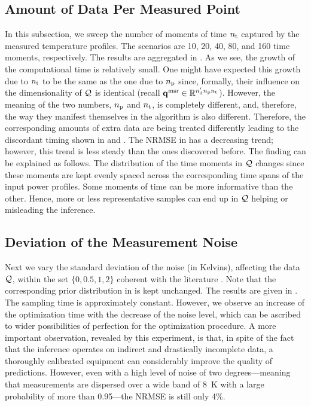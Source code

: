\subsection{Amount of Data Per Measured Point}
In this subsection, we sweep the number of moments of time ${n_\text{t}}$ captured by the measured temperature profiles.
The scenarios are 10, 20, 40, 80, and 160 time moments, respectively.
The results are aggregated in .
As we see, the growth of the computational time is relatively small.
One might have expected this growth due to ${n_\text{t}}$ to be the same as the one due to ${n_\text{p}}$ since, formally, their influence on the dimensionality of $\mathcal{Q}$ is identical (recall $\mathbf{q}^{\text{msr}} \in \mathbb{R}^{{n_\text{d}'} {n_\text{p}} {n_\text{t}}}$).
However, the meaning of the two numbers, ${n_\text{p}}$ and ${n_\text{t}}$, is completely different, and, therefore, the way they manifest themselves in the algorithm is also different.
Therefore, the corresponding amounts of extra data are being treated differently leading to the discordant timing shown in  and .
The NRMSE in  has a decreasing trend; however, this trend is less steady than the ones discovered before. The finding can be explained as follows.
The distribution of the time moments in $\mathcal{Q}$ changes since these moments are kept evenly spaced across the corresponding time spans of the input power profiles.
Some moments of time can be more informative than the other.
Hence, more or less representative samples can end up in $\mathcal{Q}$ helping or misleading the inference.

\subsection{Deviation of the Measurement Noise}
Next we vary the standard deviation of the noise (in Kelvins), affecting the data $\mathcal{Q}$, within the set $\{ 0, 0.5, 1, 2 \}$ coherent with the literature \cite{mesa-martinez2007}. Note that the corresponding prior distribution in  is kept unchanged. The results are given in .
The sampling time is approximately constant. However, we observe an increase of the optimization time with the decrease of the noise level, which can be ascribed to wider possibilities of perfection for the optimization procedure.
A more important observation, revealed by this experiment, is that, in spite of the fact that the inference operates on indirect and drastically incomplete data, a thoroughly calibrated equipment can considerably improve the quality of predictions.
However, even with a high level of noise of two degrees---meaning that measurements are dispersed over a wide band of 8~K with a large probability of more than 0.95---the NRMSE is still only 4\%.

